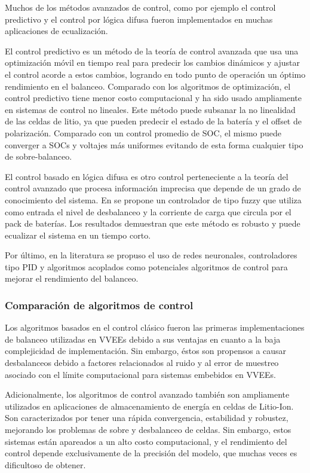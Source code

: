 Muchos de los m\'etodos avanzados de control, como por ejemplo el control
predictivo y el control por l\'ogica difusa fueron implementados en muchas
aplicaciones de ecualizaci\'on.

El control predictivo es un m\'etodo de la teor\'ia de control avanzada que usa
una optimizaci\'on m\'ovil en tiempo real para predecir los cambios din\'amicos
y ajustar el control acorde a estos cambios, logrando en todo punto de 
operaci\'on un \'optimo rendimiento en el balanceo. Comparado con los
algoritmos de optimizaci\'on, el control predictivo tiene menor costo
computacional y ha sido usado ampliamente en sistemas de control no lineales.
Este m\'etodo puede subsanar la no linealidad de las celdas de litio, ya que
pueden predecir el estado de la bater\'ia y el offset de polarizaci\'on.
Comparado con un control promedio de \acrshort{SOC}, el mismo puede converger a
\acrshort{SOC}s y voltajes m\'as uniformes evitando de esta forma cualquier tipo
de sobre-balanceo.

El control basado en l\'ogica difusa es otro control perteneciente a la teor\'ia
del control avanzado que procesa informaci\'on imprecisa que depende de un grado
de conocimiento del sistema. En \cite{jia_et_al_fuzzy} se propone un controlador 
de tipo fuzzy que utiliza como entrada el nivel de desbalanceo y la corriente de 
carga que circula por el pack de bater\'ias. Los resultados demuestran que este 
m\'etodo es robusto y puede ecualizar el sistema en un tiempo corto.

Por \'ultimo, en la literatura se propuso el uso de redes neuronales,
controladores tipo PID y algoritmos acoplados como potenciales algoritmos de
control para mejorar el rendimiento del balanceo.

\subsubsection{Comparaci\'on de algoritmos de control}

Los algoritmos basados en el control cl\'asico fueron las primeras
implementaciones de balanceo utilizadas en \acrshort{VVEE}s debido a sus 
ventajas en cuanto a la baja complejicidad de implementaci\'on. Sin embargo, 
\'estos son propensos a causar desbalanceos debido a factores relacionados al 
ruido y al error de muestreo asociado con el l\'imite computacional para 
sistemas embebidos en \acrshort{VVEE}s.

Adicionalmente, los algoritmos de control avanzado tambi\'en son ampliamente
utilizados en aplicaciones de almacenamiento de energ\'ia en celdas de
Litio-Ion. Son caracterizados por tener una r\'apida convergencia, estabilidad y
robustez, mejorando los problemas de sobre y desbalanceo de celdas. Sin embargo,
estos sistemas est\'an apareados a un alto costo computacional, y el rendimiento
del control depende exclusivamente de la precisi\'on del modelo, que muchas
veces es dificultoso de obtener.

